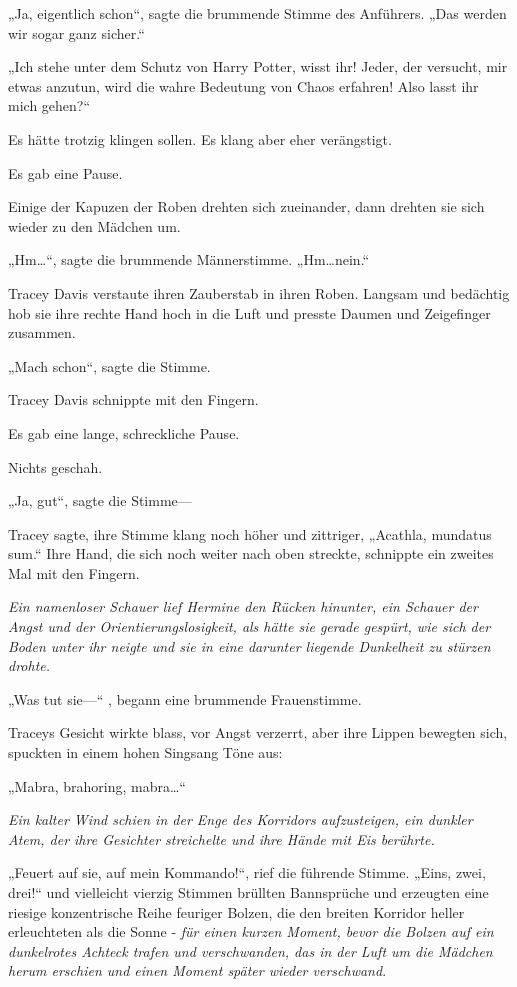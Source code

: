 {„Ja, eigentlich schon“, sagte die brummende Stimme des Anführers. „Das werden wir sogar ganz sicher.“

„Ich stehe unter dem Schutz von Harry Potter, wisst ihr! Jeder, der versucht, mir etwas anzutun, wird die wahre Bedeutung von Chaos erfahren! Also lasst ihr mich gehen?“

Es hätte trotzig klingen sollen. Es klang aber eher verängstigt.

Es gab eine Pause.

Einige der Kapuzen der Roben drehten sich zueinander, dann drehten sie sich wieder zu den Mädchen um.

„Hm…“, sagte die brummende Männerstimme. „Hm…nein.“

Tracey Davis verstaute ihren Zauberstab in ihren Roben. Langsam und bedächtig hob sie ihre rechte Hand hoch in die Luft und presste Daumen und Zeigefinger zusammen.

„Mach schon“, sagte die Stimme.

Tracey Davis schnippte mit den Fingern.

Es gab eine lange, schreckliche Pause.

Nichts geschah.

„Ja, gut“, sagte die Stimme—

Tracey sagte, ihre Stimme klang noch höher und zittriger, „Acathla, mundatus sum.“ Ihre Hand, die sich noch weiter nach oben streckte, schnippte ein zweites Mal mit den Fingern.

\emph{Ein namenloser Schauer lief Hermine den Rücken hinunter, ein Schauer der Angst und der Orientierungslosigkeit, als hätte sie gerade gespürt, wie sich der Boden unter ihr neigte und sie in eine darunter liegende Dunkelheit zu stürzen drohte.}

„Was tut sie—“ , begann eine brummende Frauenstimme.

Traceys Gesicht wirkte blass, vor Angst verzerrt, aber ihre Lippen bewegten sich, spuckten in einem hohen Singsang Töne aus:

„Mabra, brahoring, mabra…“

\emph{Ein kalter Wind schien in der Enge des Korridors aufzusteigen, ein dunkler Atem, der ihre Gesichter streichelte und ihre Hände mit Eis berührte.}

„Feuert auf sie, auf mein Kommando!“, rief die führende Stimme. „Eins, zwei, drei!“ und vielleicht vierzig Stimmen brüllten Bannsprüche und erzeugten eine riesige konzentrische Reihe feuriger Bolzen, die den breiten Korridor heller erleuchteten als die Sonne - \emph{für einen kurzen Moment, bevor die Bolzen auf ein dunkelrotes Achteck trafen und verschwanden, das in der Luft um die Mädchen herum erschien und einen Moment später wieder verschwand}.

}
